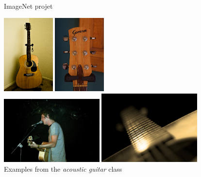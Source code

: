 \documentclass[xcolor=pdftex,dvipsnames,table,mathserif]{beamer}
\begin{document}
\begin{frame}{ImageNet projet}

      \centering
      \includegraphics[width=0.20\textwidth]{ilsvrc_guitar2}\hspace{0.1em}
      \includegraphics[width=0.20\textwidth]{ilsvrc_guitar3}\\
      \includegraphics[width=0.39\textwidth]{ilsvrc_guitar1}\hspace{0.1em}
      \includegraphics[width=0.39\textwidth]{ilsvrc_guitar4}\\
      Examples from the \emph{acoustic guitar} class


\end{frame}
\end{document}
